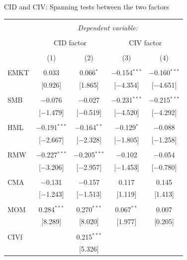 \documentclass{beamer}
\begin{document}
\scriptsize
{\renewcommand{\arraystretch}{0.52}
\begin{frame}{CID and CIV: Spanning tests between the two factors}
\vspace{-0.3cm}
\begin{table}[!htbp] \centering 
\begin{tabular}{@{\extracolsep{5pt}}lcccc} 
\\[-1.8ex]\hline 
\hline \\[-1.8ex] 
 & \multicolumn{4}{c}{\textit{Dependent variable:}} \\ 
\cline{2-5} 
\\[-1ex] & \multicolumn{2}{c}{CID factor} & \multicolumn{2}{c}{CIV factor} \\ 
\\[-1.8ex] & (1) & (2) & (3) & (4)\\ 
\hline \\[-0.5ex] 
 EMKT & 0.033 & 0.066$^{*}$ & $-$0.154$^{***}$ & $-$0.160$^{***}$ \\ 
  & [0.926] & [1.865] & [$-$4.354] & [$-$4.651] \\ 
  & & & & \\ 
 SMB & $-$0.076 & $-$0.027 & $-$0.231$^{***}$ & $-$0.215$^{***}$ \\ 
  & [$-$1.479] & [$-$0.519] & [$-$4.520] & [$-$4.292] \\ 
  & & & & \\ 
 HML & $-$0.191$^{***}$ & $-$0.164$^{**}$ & $-$0.129$^{*}$ & $-$0.088 \\ 
  & [$-$2.667] & [$-$2.328] & [$-$1.805] & [$-$1.258] \\ 
  & & & & \\ 
 RMW & $-$0.227$^{***}$ & $-$0.205$^{***}$ & $-$0.102 & $-$0.054 \\ 
  & [$-$3.206] & [$-$2.957] & [$-$1.453] & [$-$0.780] \\ 
  & & & & \\ 
 CMA & $-$0.131 & $-$0.157 & 0.117 & 0.145 \\ 
  & [$-$1.243] & [$-$1.513] & [1.119] & [1.413] \\ 
  & & & & \\ 
 MOM & 0.284$^{***}$ & 0.270$^{***}$ & 0.067$^{**}$ & 0.007 \\ 
  & [8.289] & [8.020] & [1.977] & [0.205] \\ 
  & & & & \\ 
 CIVf &  & 0.215$^{***}$ &  &  \\ 
  &  & [5.326] &  &  \\ 

\end{tabular}
\end{table}
\end{frame}}
\end{document}

